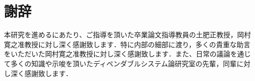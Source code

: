 
\chapter*{謝辞}

本研究を進めるにあたり、ご指導を頂いた卒業論文指導教員の土肥正教授，岡村寛之准教授に対し深く感謝致します．特に内部の細部に渡り，多くの貴重な助言をいただいた岡村寛之准教授に対し深く感謝致します．また、日常の議論を通じて多くの知識や示唆を頂いたディペンダブルシステム論研究室の先輩，同輩に対し深く感謝致します．